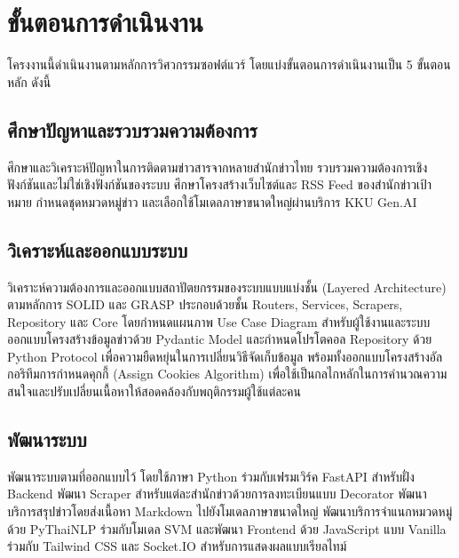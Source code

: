 
\section{ขั้นตอนการดำเนินงาน}

โครงงานนี้ดำเนินงานตามหลักการวิศวกรรมซอฟต์แวร์ โดยแบ่งขั้นตอนการดำเนินงานเป็น 5 ขั้นตอนหลัก ดังนี้

\subsection{ศึกษาปัญหาและรวบรวมความต้องการ}

ศึกษาและวิเคราะห์ปัญหาในการติดตามข่าวสารจากหลายสำนักข่าวไทย รวบรวมความต้องการเชิงฟังก์ชันและไม่ใช่เชิงฟังก์ชันของระบบ ศึกษาโครงสร้างเว็บไซต์และ RSS Feed ของสำนักข่าวเป้าหมาย กำหนดชุดหมวดหมู่ข่าว และเลือกใช้โมเดลภาษาขนาดใหญ่ผ่านบริการ KKU Gen.AI

\subsection{วิเคราะห์และออกแบบระบบ}

วิเคราะห์ความต้องการและออกแบบสถาปัตยกรรมของระบบแบบแบ่งชั้น (Layered Architecture) ตามหลักการ SOLID และ GRASP ประกอบด้วยชั้น Routers, Services, Scrapers, Repository และ Core โดยกำหนดแผนภาพ Use Case Diagram สำหรับผู้ใช้งานและระบบ ออกแบบโครงสร้างข้อมูลข่าวด้วย Pydantic Model และกำหนดโปรโตคอล Repository ด้วย Python Protocol เพื่อความยืดหยุ่นในการเปลี่ยนวิธีจัดเก็บข้อมูล พร้อมทั้งออกแบบโครงสร้างอัลกอริทึมการกำหนดคุกกี้ (Assign Cookies Algorithm) เพื่อใช้เป็นกลไกหลักในการคำนวณความสนใจและปรับเปลี่ยนเนื้อหาให้สอดคล้องกับพฤติกรรมผู้ใช้แต่ละคน

\subsection{พัฒนาระบบ}

พัฒนาระบบตามที่ออกแบบไว้ โดยใช้ภาษา Python ร่วมกับเฟรมเวิร์ค FastAPI สำหรับฝั่ง Backend พัฒนา Scraper สำหรับแต่ละสำนักข่าวด้วยการลงทะเบียนแบบ Decorator พัฒนาบริการสรุปข่าวโดยส่งเนื้อหา Markdown ไปยังโมเดลภาษาขนาดใหญ่ พัฒนาบริการจำแนกหมวดหมู่ด้วย PyThaiNLP ร่วมกับโมเดล SVM และพัฒนา Frontend ด้วย JavaScript แบบ Vanilla ร่วมกับ Tailwind CSS และ Socket.IO สำหรับการแสดงผลแบบเรียลไทม์

